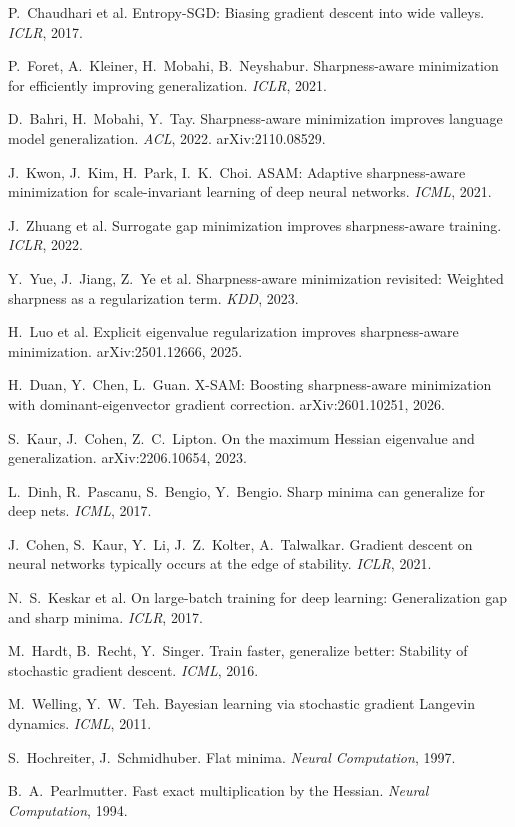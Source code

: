 \documentclass[11pt]{article}
\theoremstyle{plain}
\begin{document}
\begin{enumerate}[label={[\arabic*]},leftmargin=*,itemsep=1pt]\small
  \item P.~Chaudhari et al. Entropy-SGD: Biasing gradient descent into wide valleys. \emph{ICLR}, 2017.
  \item P.~Foret, A.~Kleiner, H.~Mobahi, B.~Neyshabur. Sharpness-aware minimization for efficiently improving generalization. \emph{ICLR}, 2021.
  \item D.~Bahri, H.~Mobahi, Y.~Tay. Sharpness-aware minimization improves language model generalization. \emph{ACL}, 2022. arXiv:2110.08529.
  \item J.~Kwon, J.~Kim, H.~Park, I.~K.~Choi. ASAM: Adaptive sharpness-aware minimization for scale-invariant learning of deep neural networks. \emph{ICML}, 2021.
  \item J.~Zhuang et al. Surrogate gap minimization improves sharpness-aware training. \emph{ICLR}, 2022.
  \item Y.~Yue, J.~Jiang, Z.~Ye et al. Sharpness-aware minimization revisited: Weighted sharpness as a regularization term. \emph{KDD}, 2023.
  \item H.~Luo et al. Explicit eigenvalue regularization improves sharpness-aware minimization. arXiv:2501.12666, 2025.
  \item H.~Duan, Y.~Chen, L.~Guan. X-SAM: Boosting sharpness-aware minimization with dominant-eigenvector gradient correction. arXiv:2601.10251, 2026.
  \item S.~Kaur, J.~Cohen, Z.~C.~Lipton. On the maximum Hessian eigenvalue and generalization. arXiv:2206.10654, 2023.
  \item L.~Dinh, R.~Pascanu, S.~Bengio, Y.~Bengio. Sharp minima can generalize for deep nets. \emph{ICML}, 2017.
  \item J.~Cohen, S.~Kaur, Y.~Li, J.~Z.~Kolter, A.~Talwalkar. Gradient descent on neural networks typically occurs at the edge of stability. \emph{ICLR}, 2021.
  \item N.~S.~Keskar et al. On large-batch training for deep learning: Generalization gap and sharp minima. \emph{ICLR}, 2017.
  \item M.~Hardt, B.~Recht, Y.~Singer. Train faster, generalize better: Stability of stochastic gradient descent. \emph{ICML}, 2016.
  \item M.~Welling, Y.~W.~Teh. Bayesian learning via stochastic gradient Langevin dynamics. \emph{ICML}, 2011.
  \item S.~Hochreiter, J.~Schmidhuber. Flat minima. \emph{Neural Computation}, 1997.
  \item B.~A.~Pearlmutter. Fast exact multiplication by the Hessian. \emph{Neural Computation}, 1994.
\end{enumerate}
\end{document}

